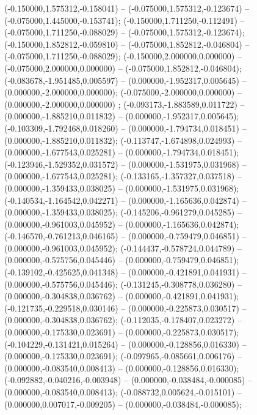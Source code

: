 (-0.150000,1.575312,-0.158041) -- (-0.075000,1.575312,-0.123674) -- (-0.075000,1.445000,-0.153741);
 (-0.150000,1.711250,-0.112491) -- (-0.075000,1.711250,-0.088029) -- (-0.075000,1.575312,-0.123674);
 (-0.150000,1.852812,-0.059810) -- (-0.075000,1.852812,-0.046804) -- (-0.075000,1.711250,-0.088029);
 (-0.150000,2.000000,0.000000) -- (-0.075000,2.000000,0.000000) -- (-0.075000,1.852812,-0.046804);
 (-0.083678,-1.951485,0.005597) -- (0.000000,-1.952317,0.005645) -- (0.000000,-2.000000,0.000000);
 (-0.075000,-2.000000,0.000000) -- (0.000000,-2.000000,0.000000) ;
 (-0.093173,-1.883589,0.011722) -- (0.000000,-1.885210,0.011832) -- (0.000000,-1.952317,0.005645);
 (-0.103309,-1.792468,0.018260) -- (0.000000,-1.794734,0.018451) -- (0.000000,-1.885210,0.011832);
 (-0.113747,-1.674898,0.024993) -- (0.000000,-1.677543,0.025281) -- (0.000000,-1.794734,0.018451);
 (-0.123946,-1.529352,0.031572) -- (0.000000,-1.531975,0.031968) -- (0.000000,-1.677543,0.025281);
 (-0.133165,-1.357327,0.037518) -- (0.000000,-1.359433,0.038025) -- (0.000000,-1.531975,0.031968);
 (-0.140534,-1.164542,0.042271) -- (0.000000,-1.165636,0.042874) -- (0.000000,-1.359433,0.038025);
 (-0.145206,-0.961279,0.045285) -- (0.000000,-0.961003,0.045952) -- (0.000000,-1.165636,0.042874);
 (-0.146570,-0.761213,0.046165) -- (0.000000,-0.759479,0.046851) -- (0.000000,-0.961003,0.045952);
 (-0.144437,-0.578724,0.044789) -- (0.000000,-0.575756,0.045446) -- (0.000000,-0.759479,0.046851);
 (-0.139102,-0.425625,0.041348) -- (0.000000,-0.421891,0.041931) -- (0.000000,-0.575756,0.045446);
 (-0.131245,-0.308778,0.036280) -- (0.000000,-0.304838,0.036762) -- (0.000000,-0.421891,0.041931);
 (-0.121735,-0.229518,0.030146) -- (0.000000,-0.225873,0.030517) -- (0.000000,-0.304838,0.036762);
 (-0.112035,-0.178407,0.023272) -- (0.000000,-0.175330,0.023691) -- (0.000000,-0.225873,0.030517);
 (-0.104229,-0.131421,0.015264) -- (0.000000,-0.128856,0.016330) -- (0.000000,-0.175330,0.023691);
 (-0.097965,-0.085661,0.006176) -- (0.000000,-0.083540,0.008413) -- (0.000000,-0.128856,0.016330);
 (-0.092882,-0.040216,-0.003948) -- (0.000000,-0.038484,-0.000085) -- (0.000000,-0.083540,0.008413);
 (-0.088732,0.005624,-0.015101) -- (0.000000,0.007017,-0.009205) -- (0.000000,-0.038484,-0.000085);
